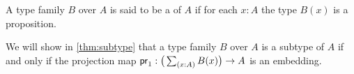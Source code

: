 \begin{defn}
A type family $B$ over $A$ is said to be a  of $A$ if for each $x:A$ the type $B(x)$ is a proposition.
\end{defn}

We will show in \cref{thm:subtype} that a type family $B$ over $A$ is a subtype of $A$ if and only if the projection map $\proj 1:\big(\sm{x:A}B(x)\big)\to A$ is an embedding.

\begin{comment}
\begin{samepage}
\begin{thm}\label{thm:subtype}
Let $B$ be a type family over $A$. The following are equivalent:
\begin{enumerate}
\item The family $B$ over $A$ is a \define{subtype} of $A$, in the sense that for each $x:A$ the type $B(x)$ is a proposition.
\item The projection map
\begin{equation*}
\proj 1 : \Big(\sm{x:A}B(x)\Big)\to A
\end{equation*}
is an embedding. 
\end{enumerate}
\end{thm}
\end{samepage}

\begin{proof}
First assume that $B(x)$ is a proposition for each $x:A$. Our goal is to show that
\begin{equation*}
\apfunc{\proj 1} : (\id{s}{t})\to (\id{\proj 1(s)}{\proj 1(t)})
\end{equation*}
is an equivalence for every $s,t:\sm{x:A}B(x)$. By $\Sigma$-induction on $s$ and \cref{thm:id_fundamental} it suffices to show that the type
\begin{equation*}
\sm{t:\sm{x:A}B(x)} \id{a}{\proj 1(t)}
\end{equation*}
is contractible, for any $a:A$ and $b:B(a)$. 
For the center of contraction we take $\pairr{\pairr{a,b},\refl{a}}$. 
The contraction is constructed by applying $\Sigma$-induction twice, by which it suffices to construct a term of type
\begin{equation*}
\prd{x:A}{y:B(x)}{p:\id{a}{x}} \pairr{\pairr{a,b},\refl{a}}=\pairr{\pairr{x,y},p}.
\end{equation*}
This term is constructed by path induction on $p$, so it suffices to construct a term of type
\begin{equation*}
\prd{y:B(a)} \pairr{\pairr{a,b},\refl{a}}=\pairr{\pairr{a,y},\refl{a}}
\end{equation*}
However, the proposition $B(a)$ is contractible by \cref{cor:contr_prop}, since we have $b:B(a)$. Therefore we may proceed by singleton induction, so it suffices to construct an identification of type
\begin{equation*}
\pairr{\pairr{a,b},\refl{a}}=\pairr{\pairr{a,b},\refl{a}},
\end{equation*}
which we have by reflexivity. This completes the proof that if each $B(x)$ is a proposition, then the projection map $\proj 1 : \big(\sm{x:A}B(x)\big)\to A$ is an embedding.


\end{comment}
